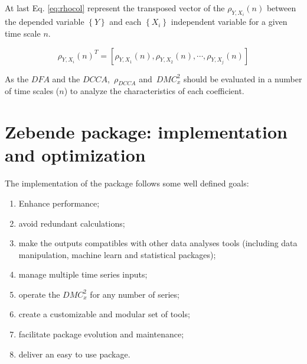 \documentclass[article]{jss}
\begin{document}
At last Eq. \ref{eq:rhocol} represent the transposed vector of the $\rho_{Y,X_{i}}(n)$ between the depended variable $\left\lbrace Y \right\rbrace $ and each $\left\lbrace X_{i} \right\rbrace $ independent variable for a given time scale $n$.

\begin{equation} \label{eq:rhocol}
  \rho_{Y,X_i}(n)^T=[\rho_{Y,X_1}(n), \rho_{Y,X_2}(n),\cdots,\rho_{Y,X_j}(n)]
\end{equation}

As the $DFA$ and the $DCCA$,~$\rho_{DCCA}$ and~$DMC_x^2$ should be evaluated in a number of time scales ($n$) to analyze the characteristics of each coefficient.



\section{Zebende package: implementation and optimization} \label{sec:optimization}

The implementation of the  package follows some well defined goals:

\begin{enumerate}
  \item Enhance performance;
  \item avoid redundant calculations;
  \item make the outputs compatibles with other data analyses tools (including data manipulation, machine learn and statistical packages);
  \item manage multiple time series inputs;
  \item operate the $DMC_x^2$ for any number of series;
  \item create a customizable and modular set of tools;
  \item facilitate package evolution and maintenance;
  \item deliver an easy to use package.
\end{enumerate}
\end{document}
